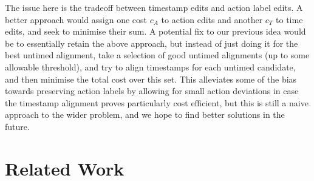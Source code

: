 \documentclass[conference]{IEEEtran}
\begin{document}
		The issue here is the tradeoff between timestamp edits and action label edits. 
		A better approach would assign one cost $c_A$ to action edits and another $c_T$ to time edits, and seek to minimise their sum. 
		A potential fix to our previous idea would be to essentially retain the above approach, but instead of just doing it for the best untimed alignment, take a selection of good untimed alignments (up to some allowable threshold), and try to align timestamps for each untimed candidate, and then minimise the total cost over this set. This alleviates some of the bias towards preserving action labels by allowing for small action deviations in case the timestamp alignment proves particularly cost efficient, but this is still a naive approach to the wider problem, and we hope to find better solutions in the future. 
		
		\section{Related Work}\label{relwork}
\end{document}
